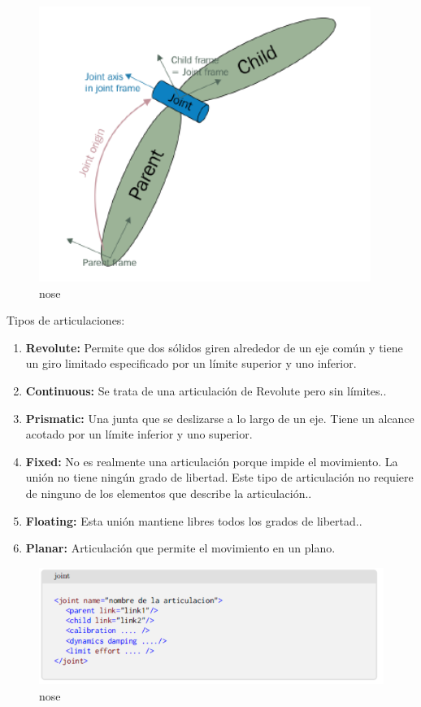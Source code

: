         \begin{figure}[htb]
            \centering
            \includegraphics[width=0.65\linewidth]{Main/Chapter3/Images3/3-8/representacion-de-una-articulacion-en-URDF.png}
            \caption{nose}
            \label{f:Cap3-8_nose_nose}
        \end{figure} 
        
        Tipos de articulaciones:
        
        \begin{enumerate}
           \item \textbf{Revolute:} Permite que dos sólidos giren alrededor de un eje común y tiene un giro limitado especificado por un límite superior y uno inferior.
            \item \textbf{Continuous:} Se trata de una articulación de Revolute pero sin límites..
            \item \textbf{Prismatic:} Una junta que se deslizarse a lo largo de un eje. Tiene un alcance acotado por un límite inferior y uno superior.
            \item \textbf{Fixed:} No es realmente una articulación porque impide el movimiento. La unión no tiene ningún grado de libertad. Este tipo de articulación no requiere de ninguno de los elementos que describe la articulación..
            \item \textbf{Floating:} Esta unión mantiene libres todos los grados de libertad..
            \item \textbf{Planar:} Articulación que permite el movimiento en un plano.
        \end{enumerate}
        
        \begin{figure}[htb]
            \centering
            \includegraphics[width=0.8\linewidth]{Main/Chapter3/Images3/3-8/codigo-joint.png}
            \caption{nose}
            \label{f:Cap3-8_nose_nose}
        \end{figure} 
        
